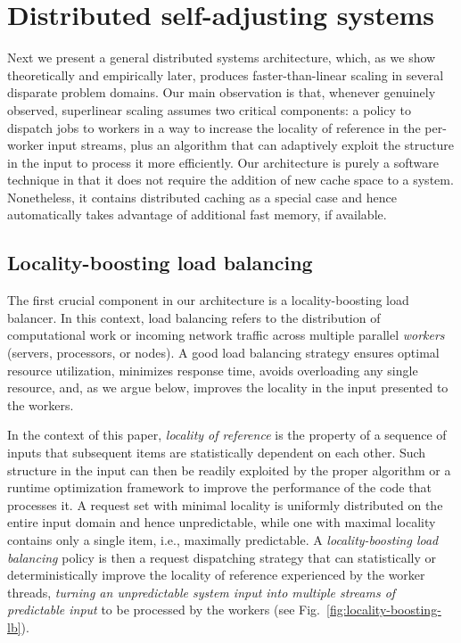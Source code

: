\section{Distributed self-adjusting systems}
\label{sec:architecture}

Next we present a general distributed systems architecture, which, as we show theoretically and empirically later, produces faster-than-linear scaling in several disparate problem domains. Our main observation is that, whenever genuinely observed, superlinear scaling assumes two critical components: a policy to dispatch jobs to workers in a way to increase the locality of reference in the per-worker input streams, plus an algorithm that can adaptively exploit the structure in the input to process it more efficiently. Our architecture is purely a software technique in that it does not require the addition of new cache space to a system. Nonetheless, it contains distributed caching as a special case and hence automatically takes advantage of additional fast memory, if available.

\subsection{Locality-boosting load balancing}
\label{sec:lb-lb}

The first crucial component in our architecture is a locality-boosting load balancer.  In this context, load balancing refers to the distribution of computational work or incoming network traffic across multiple parallel \emph{workers} (servers, processors, or nodes). A good load balancing strategy ensures optimal resource utilization, minimizes response time, avoids overloading any single resource, and, as we argue below, improves the locality in the input presented to the workers. 

In the context of this paper, \emph{locality of reference} is the property of a sequence of inputs that subsequent items are statistically dependent on each other. Such structure in the input can then be readily exploited by the proper algorithm \cite{SleatorT85Splay, BentleyCL93, HesterH85, HesterH85, BentleySTW86, Avin0020, ParkM12} or a runtime optimization framework \cite{276946,246322,10.1145/3503222.3507769,procieee_2019} to improve the performance of the code that processes it. A request set with minimal locality is uniformly distributed on the entire input domain and hence unpredictable, while one with maximal locality contains only a single item, i.e., maximally predictable. A \emph{locality-boosting load balancing} policy is then a request dispatching strategy that can statistically or deterministically improve the locality of reference experienced by the worker threads, \emph{turning an unpredictable system input into multiple streams of predictable input} to be processed by the workers (see Fig.~\ref{fig:locality-boosting-lb}).

